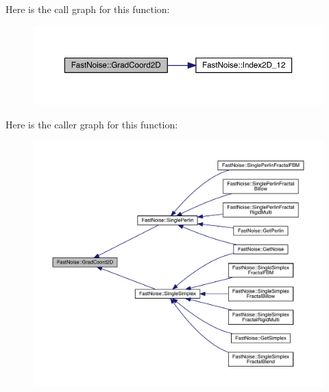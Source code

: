 Here is the call graph for this function\+:
\nopagebreak
\begin{figure}[H]
\begin{center}
\leavevmode
\includegraphics[width=350pt]{d1/dd8/class_fast_noise_ad264b1bd7c819f7d5d9b5d5695a140a8_cgraph}
\end{center}
\end{figure}
Here is the caller graph for this function\+:
\nopagebreak
\begin{figure}[H]
\begin{center}
\leavevmode
\includegraphics[width=350pt]{d1/dd8/class_fast_noise_ad264b1bd7c819f7d5d9b5d5695a140a8_icgraph}
\end{center}
\end{figure}
\mbox{\label{class_fast_noise_a96bc7b4cc9a84cec68c16bf6dfce4f53}} 
